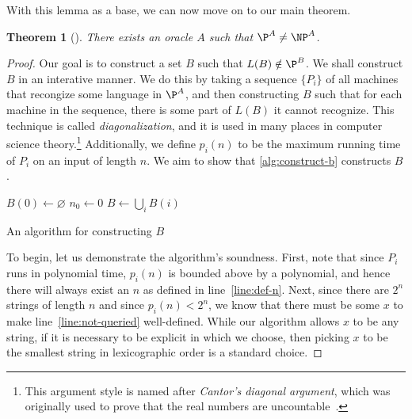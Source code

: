 \documentclass[english,12pt]{reedthesis}
\theoremstyle{plain}
\newtheorem{thm}{Theorem}[section]
\theoremstyle{definition}
\theoremstyle{remark}
\begin{document}
With this lemma as a base, we can now move on to our main theorem.

\begin{thm}[{\cite[Theorem 3]{BGS75}}]\label{thm:p-np-nrel}
  There exists an oracle $A$ such that $\P^{A} \ne \NP^{A}$.
\end{thm}

\begin{proof}
  Our goal is to construct a set $B$ such that $L(B) \notin \P^{B}$. We shall
  construct $B$ in an interative manner. We do this by taking a sequence
  $\{P_{i}\}$ of all machines that recongize some language in $\P^{A}$, and then
  constructing $B$ such that for each machine in the sequence, there is some
  part of $L(B)$ it cannot recognize. This technique is called
  \emph{diagonalization}, and it is used in many places
  in computer science theory.\footnote{This argument style is named after
    \emph{Cantor's diagonal argument}, which was originally used to prove that
    the real numbers are uncountable~\cite[Thm. 2.14]{Ru76}.} Additionally, we
  define $p_{i}(n)$ to be the maximum running time of $P_{i}$ on an input of
  length $n$. We aim to show that \cref{alg:construct-b} constructs $B$.

  \begin{algorithm}[htbp]
    $B(0) \leftarrow \varnothing$\;
    $n_{0} \leftarrow 0$\;
    $B \leftarrow \bigcup_{i}B(i)$\;
    \caption{An algorithm for constructing $B$}\label{alg:construct-b}
  \end{algorithm}

  To begin, let us demonstrate the algorithm's soundness. First, note that since
  $P_{i}$ runs in polynomial time, $p_{i}(n)$ is bounded above by a polynomial,
  and hence there will always exist an $n$ as defined in line~\ref{line:def-n}.
  Next, since there are $2^{n}$ strings of length $n$ and since
  $p_{i}(n) < 2^{n}$, we know that there must be some $x$ to make
  line~\ref{line:not-queried} well-defined. While our algorithm allows $x$ to be
  any string, if it is necessary to be explicit in which we choose, then picking
  $x$ to be the smallest string in lexicographic order is a standard choice.


\end{proof}
\end{document}
